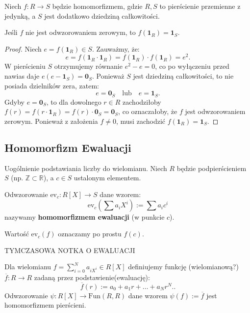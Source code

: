\begin{theorem}
    Niech $f: R \to S$ będzie homomorfizmem, gdzie $R, S$ to pierścienie przemienne z jedynką, a $S$ jest dodatkowo dziedziną całkowitości.

    Jeśli $f$ nie jest odwzorowaniem zerowym, to $f(\mathbf{1}_R) = \mathbf{1}_S$.
\end{theorem}

\begin{proof}
    Niech $e = f(\mathbf{1}_R) \in S$. Zauważmy, że:
    \[ e = f(\mathbf{1}_R \cdot \mathbf{1}_R) = f(\mathbf{1}_R) \cdot f(\mathbf{1}_R) = e^2. \]
    W pierścieniu $S$ otrzymujemy równanie $e^2 - e = 0$, co po wyłączeniu przed nawias daje $e(e - \mathbf{1}_S) = \mathbf{0}_S$. 
    Ponieważ $S$ jest dziedziną całkowitości, to nie posiada dzielników zera, zatem:
    \[ e = \mathbf{0}_S \quad \text{lub} \quad e = \mathbf{1}_S. \]
    Gdyby $e = \mathbf{0}_S$, to dla dowolnego $r \in R$ zachodziłoby $f(r) = f(r \cdot \mathbf{1}_R) = f(r) \cdot \mathbf{0}_S = \mathbf{0}_S$, co oznaczałoby, że $f$ jest odwzorowaniem zerowym. Ponieważ z założenia $f \neq 0$, musi zachodzić $f(\mathbf{1}_R) = \mathbf{1}_S$.
\end{proof}


\subsection*{Homomorfizm Ewaluacji}

Uogólnienie podstawiania liczby do wielomianu.
Niech $R$ będzie podpierścieniem $S$ (np. $\mathbb{Z} \subset \mathbb{R}$), a $c \in S$ ustalonym elementem.

\begin{definition}[Ewaluacja]
    Odwzorowanie $\text{ev}_c: R[X] \to S$ dane wzorem:
    \[ \text{ev}_c \left( \sum a_i X^i \right) := \sum a_i c^i \]
    nazywamy \textbf{homomorfizmem ewaluacji} (w punkcie $c$).
    
    Wartość $\text{ev}_c(f)$ oznaczamy po prostu $f(c)$.
\end{definition}

\noindent TYMCZASOWA NOTKA O EWALUACJI


\noindent Dla wielomianu $f = \sum_{i=0}^{N} a_{iX^{i}} \in R\left[ X \right] $ definiujemy funkcję (wielomianową?) $\overline{f} : R \to R$ zadaną przez podstawienie(ewaluację):
\[
\overline{f}\left( r \right) := a_0 + a_1r + \ldots + a_{N}r^{N}.
.\] 
Odwzorowanie $\psi: R\left[ X \right] \to \text{Fun}\left( R,R \right) $ dane wzorem $\psi\left( f \right) := \overline{f}$ jest homomorfizmem pierścieni.


